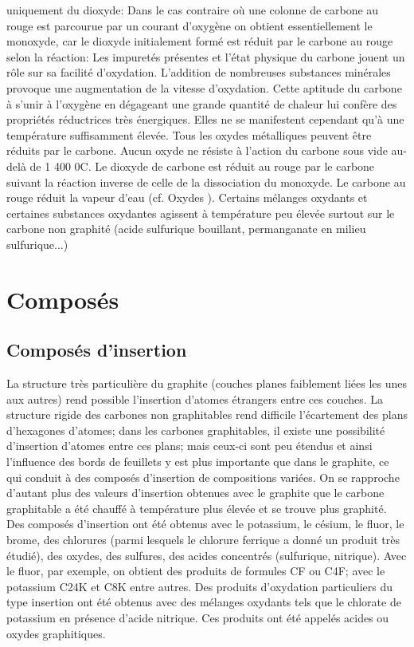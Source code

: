 \documentclass[]{article}
\begin{document}
uniquement du dioxyde: Dans le cas contraire où une colonne de
carbone au rouge est parcourue par un courant d'oxygène on obtient
essentiellement le monoxyde, car le dioxyde initialement formé est
réduit par le carbone au rouge selon la réaction: Les
impuretés présentes et l'état physique du carbone jouent un
rôle sur sa facilité d'oxydation. L'addition de nombreuses
substances minérales provoque une augmentation de la vitesse
d'oxydation. Cette aptitude du carbone à s'unir à l'oxygène
en dégageant une grande quantité de chaleur lui confère des
propriétés réductrices très énergiques. Elles ne se
manifestent cependant qu'à une température suffisamment
élevée. Tous les oxydes métalliques peuvent être
réduits par le carbone. Aucun oxyde ne résiste à l'action du
carbone sous vide au-delà de 1 400 0C. Le dioxyde de carbone
est réduit au rouge par le carbone suivant la réaction inverse
de celle de la dissociation du monoxyde. Le carbone au rouge réduit
la vapeur d'eau (cf. Oxydes ). Certains mélanges oxydants et
certaines substances oxydantes agissent à température peu
élevée surtout sur le carbone non graphité (acide sulfurique
bouillant, permanganate en milieu sulfurique...)  

\section{Composés}

\subsection{Composés d'insertion} 

La structure très particulière du graphite (couches planes
faiblement liées les unes aux autres) rend possible l'insertion
d'atomes étrangers entre ces couches. La structure rigide des
carbones non graphitables rend difficile l'écartement des plans
d'hexagones d'atomes; dans les carbones graphitables, il existe une
possibilité d'insertion d'atomes entre ces plans; mais ceux-ci sont
peu étendus et ainsi l'influence des bords de feuillets y est plus
importante que dans le graphite, ce qui conduit à des composés
d'insertion de compositions variées. On se rapproche d'autant plus
des valeurs d'insertion obtenues avec le graphite que le carbone
graphitable a été chauffé à température plus
élevée et se trouve plus graphité.  Des composés
d'insertion ont été obtenus avec le potassium, le césium, le
fluor, le brome, des chlorures (parmi lesquels le chlorure ferrique a
donné un produit très étudié), des oxydes, des sulfures,
des acides concentrés (sulfurique, nitrique). Avec le fluor, par
exemple, on obtient des produits de formules CF ou C4F; avec le
potassium C24K et C8K entre autres. Des produits d'oxydation
particuliers du type insertion ont été obtenus avec des
mélanges oxydants tels que le chlorate de potassium en présence
d'acide nitrique. Ces produits ont été appelés acides ou
oxydes graphitiques.
\end{document}
